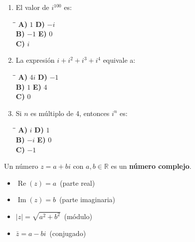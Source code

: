 \documentclass[11pt,a4paper]{article}
\begin{document}
\begin{multicols}{2}
\begin{enumerate}[label=\textbf{\arabic*.},start=1]
\item El valor de $i^{100}$ es:
\begin{tabbing}
\hspace{0.5cm}\=\hspace{3.5cm}\=\kill
\textbf{A)} $1$ \> \textbf{D)} $-i$ \\
\textbf{B)} $-1$ \> \textbf{E)} $0$ \\
\textbf{C)} $i$ \\
\end{tabbing}
\item La expresión $i+i^2+i^3+i^4$ equivale a:
\begin{tabbing}
\hspace{0.5cm}\=\hspace{3.5cm}\=\kill
\textbf{A)} $4i$ \> \textbf{D)} $-1$ \\
\textbf{B)} $1$ \> \textbf{E)} $4$ \\
\textbf{C)} $0$ \\
\end{tabbing}
\item Si $n$ es múltiplo de 4, entonces $i^n$ es:
\begin{tabbing}
\hspace{0.5cm}\=\hspace{3.5cm}\=\kill
\textbf{A)} $i$ \> \textbf{D)} $1$ \\
\textbf{B)} $-i$ \> \textbf{E)} $0$ \\
\textbf{C)} $-1$ \\
\end{tabbing}
\end{enumerate}
\end{multicols}

\vspace{4mm}
\begin{cajat}[NÚMERO COMPLEJO $z = a + bi$]
Un número $z = a+bi$ con $a,b\in\mathbb{R}$ es un \textbf{número complejo}.

\begin{itemize}[leftmargin=1.5em]
  \item $\operatorname{Re}(z)=a$\ (parte real)
  \item $\operatorname{Im}(z)=b$\ (parte imaginaria)
  \item $|z|=\sqrt{a^2+b^2}$\ (módulo)
  \item $\bar{z}=a-bi$\ (conjugado)
\end{itemize}
\end{cajat}
\end{document}
